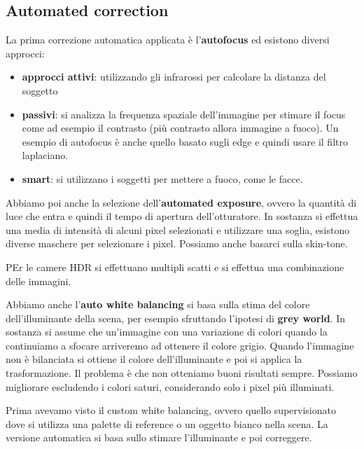 \subsection{Automated correction}
La prima correzione automatica applicata è l'\textbf{autofocus} ed esistono diversi 
approcci:
\begin{itemize}
    \item \textbf{approcci attivi}: utilizzando gli infrarossi per calcolare la
    distanza del soggetto
    \item \textbf{passivi}: si analizza la frequenza spaziale dell'immagine per 
    stimare il focus come ad esempio il contrasto (più contrasto allora immagine a fuoco).
    Un esempio di autofocus è anche quello basato sugli edge e quindi usare il filtro 
    laplaciano.
    \item \textbf{smart}: si utilizzano i soggetti per mettere a fuoco, come le facce.
\end{itemize}

Abbiamo poi anche la selezione dell'\textbf{automated exposure}, ovvero la quantità 
di luce che entra e quindi il tempo di apertura dell'otturatore. In sostanza si 
effettua una media di intensità di alcuni pixel selezionati e utilizzare una soglia, esistono diverse maschere 
per selezionare i pixel. Possiamo anche basarci sulla skin-tone.

\begin{nota}
    PEr le camere HDR si effettuano multipli scatti e si effettua una combinazione
    delle immagini.
\end{nota}

Abbiamo anche l'\textbf{auto white balancing} si basa sulla stima del colore dell'illuminante 
della scena, per esempio sfruttando l'ipotesi di \textbf{grey world}. In sostanza 
si assume che un'immagine con una variazione di colori quando la continuiamo a sfocare 
arriveremo ad ottenere il colore grigio. Quando l'immagine non è bilanciata si ottiene 
il colore dell'illuminante e poi si applica la trasformazione. Il problema è che non 
otteniamo buoni risultati sempre. Possiamo migliorare escludendo i colori saturi,
considerando solo i pixel più illuminati.

\begin{nota}
    Prima avevamo visto il custom white balancing, ovvero quello supervisionato
    dove si utilizza una palette di reference o un oggetto bianco nella scena. La 
    versione automatica si basa sullo stimare l'illuminante e poi correggere.
\end{nota}

